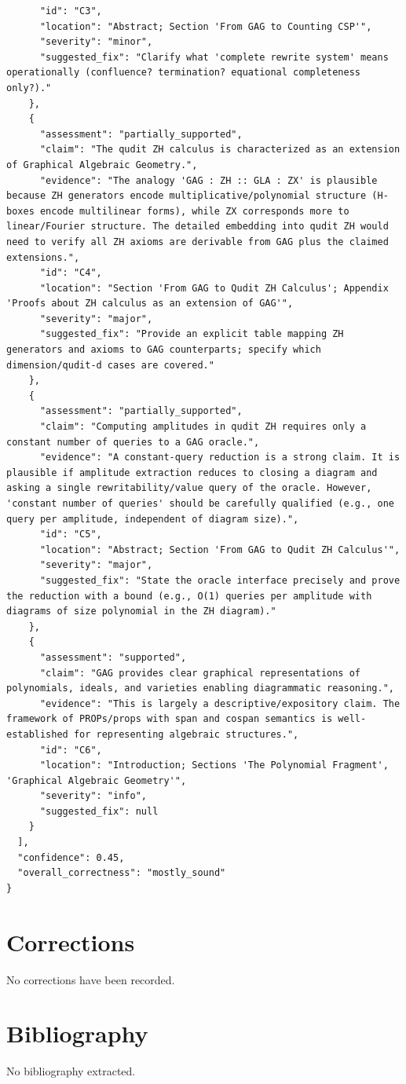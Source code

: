 \documentclass[11pt]{article}
\begin{document}
\begin{verbatim}
      "id": "C3",
      "location": "Abstract; Section 'From GAG to Counting CSP'",
      "severity": "minor",
      "suggested_fix": "Clarify what 'complete rewrite system' means operationally (confluence? termination? equational completeness only?)."
    },
    {
      "assessment": "partially_supported",
      "claim": "The qudit ZH calculus is characterized as an extension of Graphical Algebraic Geometry.",
      "evidence": "The analogy 'GAG : ZH :: GLA : ZX' is plausible because ZH generators encode multiplicative/polynomial structure (H-boxes encode multilinear forms), while ZX corresponds more to linear/Fourier structure. The detailed embedding into qudit ZH would need to verify all ZH axioms are derivable from GAG plus the claimed extensions.",
      "id": "C4",
      "location": "Section 'From GAG to Qudit ZH Calculus'; Appendix 'Proofs about ZH calculus as an extension of GAG'",
      "severity": "major",
      "suggested_fix": "Provide an explicit table mapping ZH generators and axioms to GAG counterparts; specify which dimension/qudit-d cases are covered."
    },
    {
      "assessment": "partially_supported",
      "claim": "Computing amplitudes in qudit ZH requires only a constant number of queries to a GAG oracle.",
      "evidence": "A constant-query reduction is a strong claim. It is plausible if amplitude extraction reduces to closing a diagram and asking a single rewritability/value query of the oracle. However, 'constant number of queries' should be carefully qualified (e.g., one query per amplitude, independent of diagram size).",
      "id": "C5",
      "location": "Abstract; Section 'From GAG to Qudit ZH Calculus'",
      "severity": "major",
      "suggested_fix": "State the oracle interface precisely and prove the reduction with a bound (e.g., O(1) queries per amplitude with diagrams of size polynomial in the ZH diagram)."
    },
    {
      "assessment": "supported",
      "claim": "GAG provides clear graphical representations of polynomials, ideals, and varieties enabling diagrammatic reasoning.",
      "evidence": "This is largely a descriptive/expository claim. The framework of PROPs/props with span and cospan semantics is well-established for representing algebraic structures.",
      "id": "C6",
      "location": "Introduction; Sections 'The Polynomial Fragment', 'Graphical Algebraic Geometry'",
      "severity": "info",
      "suggested_fix": null
    }
  ],
  "confidence": 0.45,
  "overall_correctness": "mostly_sound"
}
\end{verbatim}

\section*{Corrections}
No corrections have been recorded.

\section*{Bibliography}
No bibliography extracted.

% 
% 
\end{document}
